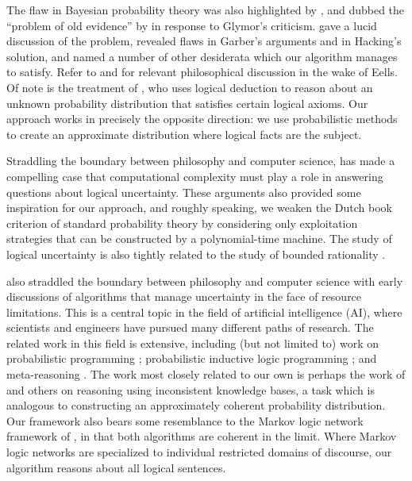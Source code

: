 \documentclass[authordate,onecolumn,noenvironments]{miri-tech-article}
\numberwithin{equation}{subsection}
\begin{document}
The flaw in Bayesian probability theory was also highlighted by \citet{Glymour:1980:OldEvidence}, and dubbed the ``problem of old evidence'' by \citet{Garber:1983:OldEvidence} in response to Glymor's criticism. \citet{Eells:1990:OldEvidence} gave a lucid discussion of the problem, revealed flaws in Garber's arguments and in Hacking's solution, and named a number of other desiderata which our algorithm manages to satisfy. Refer to \citet{zynda1995old} and \citet{sprenger2015novel} for relevant philosophical discussion in the wake of Eells. Of note is the treatment of \citet{adams1996primer}, who uses logical deduction to reason about an unknown probability distribution that satisfies certain logical axioms. Our approach works in precisely the opposite direction: we use probabilistic methods to create an approximate distribution where logical facts are the subject.

Straddling the boundary between philosophy and computer science, \citet{Aaronson:2013:PhilosophersComplexity} has made a compelling case that computational complexity must play a role in answering questions about logical uncertainty. These arguments also provided some inspiration for our approach, and roughly speaking, we weaken the Dutch book criterion of standard probability theory by considering only exploitation strategies that can be constructed by a polynomial-time machine. The study of logical uncertainty is also tightly related to the study of bounded rationality \citep{simon1982models,russell1991right,rubinstein1998modeling,russell2016rationality}.

\citet{fagin1987belief} also straddled the boundary between philosophy and computer science with early discussions of algorithms that manage uncertainty in the face of resource limitations.  This is a central topic in the field of artificial intelligence (AI), where scientists and engineers have pursued many different paths of research. The related work in this field is extensive, including (but not limited to) work on probabilistic programming \citep{vajda2014probabilistic,mccallum2009factorie,wood2014new,de2015probabilistic}; probabilistic inductive logic programming \citep{muggleton2015latest,de2008probabilistic,de2008logical,kersting2007bayesian}; and meta-reasoning \citep{russell1991principles,zilberstein2008metareasoning,Hay:2012:Selecting}. The work most closely related to our own is perhaps the work of \citet{thimm2009measuring} and others on reasoning using inconsistent knowledge bases, a task which is analogous to constructing an approximately coherent probability distribution.  Our framework also bears some resemblance to the Markov logic network framework of \citet{Richardson:2006}, in that both algorithms are coherent in the limit. Where Markov logic networks are specialized to individual restricted domains of discourse, our algorithm reasons about all logical sentences. 
\end{document}
